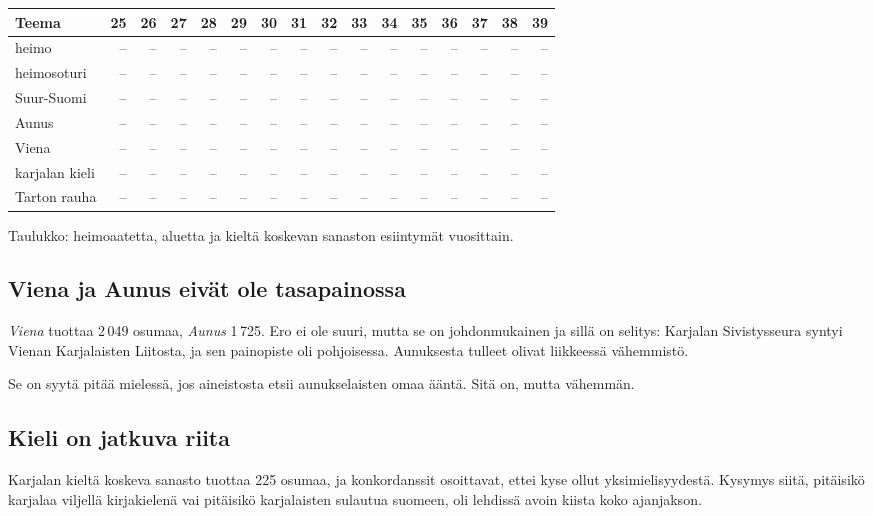 \documentclass[10pt,a4paper]{article}
\begin{document}
\begin{center}\small
\begin{tabular}{@{}lrrrrrrrrrrrrrrr@{}}
\toprule
\textbf{Teema} & \textbf{25} & \textbf{26} & \textbf{27} & \textbf{28} & \textbf{29} & \textbf{30} & \textbf{31} & \textbf{32} & \textbf{33} & \textbf{34} & \textbf{35} & \textbf{36} & \textbf{37} & \textbf{38} & \textbf{39}\\
\midrule
heimo & -- & -- & -- & -- & -- & -- & -- & -- & -- & -- & -- & -- & -- & -- & --\\
heimosoturi & -- & -- & -- & -- & -- & -- & -- & -- & -- & -- & -- & -- & -- & -- & --\\
Suur-Suomi & -- & -- & -- & -- & -- & -- & -- & -- & -- & -- & -- & -- & -- & -- & --\\
Aunus & -- & -- & -- & -- & -- & -- & -- & -- & -- & -- & -- & -- & -- & -- & --\\
Viena & -- & -- & -- & -- & -- & -- & -- & -- & -- & -- & -- & -- & -- & -- & --\\
karjalan kieli & -- & -- & -- & -- & -- & -- & -- & -- & -- & -- & -- & -- & -- & -- & --\\
Tarton rauha & -- & -- & -- & -- & -- & -- & -- & -- & -- & -- & -- & -- & -- & -- & --\\
\bottomrule
\end{tabular}
\end{center}
{\footnotesize Taulukko: heimoaatetta, aluetta ja kieltä koskevan sanaston esiintymät vuosittain.}

\subsection{Viena ja Aunus eivät ole tasapainossa}

\emph{Viena} tuottaa 2\,049 osumaa, \emph{Aunus} 1\,725. Ero ei ole suuri, mutta se on
johdonmukainen ja sillä on selitys: Karjalan Sivistysseura syntyi Vienan
Karjalaisten Liitosta, ja sen painopiste oli pohjoisessa. Aunuksesta tulleet olivat
liikkeessä vähemmistö.

Se on syytä pitää mielessä, jos aineistosta etsii aunukselaisten omaa ääntä. Sitä on,
mutta vähemmän.

\subsection{Kieli on jatkuva riita}

Karjalan kieltä koskeva sanasto tuottaa 225 osumaa, ja konkordanssit osoittavat, ettei
kyse ollut yksimielisyydestä. Kysymys siitä, pitäisikö karjalaa viljellä kirjakielenä
vai pitäisikö karjalaisten sulautua suomeen, oli lehdissä avoin kiista koko
ajanjakson.
\end{document}
